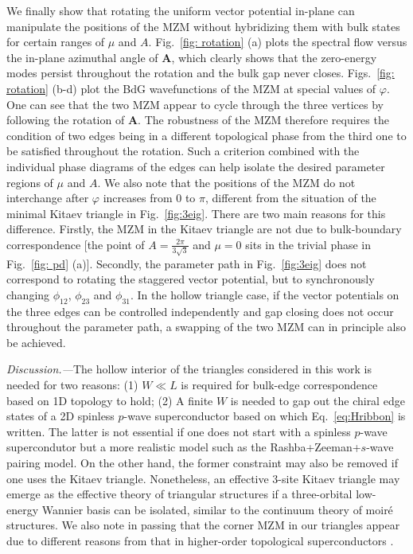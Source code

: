 \documentclass[aps,prb,twocolumn,showpacs,amsmath,amssymb,superscriptaddress]{revtex4-2}
\begin{document}
We finally show that rotating the uniform vector potential in-plane can manipulate the positions of the MZM without hybridizing them with bulk states for certain ranges of $\mu$ and $A$. Fig.~\ref{fig: rotation} (a) plots the spectral flow versus the in-plane azimuthal angle of $\mathbf A$, which clearly shows that the zero-energy modes persist throughout the rotation and the bulk gap never closes. Figs.~\ref{fig: rotation} (b-d) plot the BdG wavefunctions of the MZM at special values of $\varphi$. One can see that the two MZM appear to cycle through the three vertices by following the rotation of $\mathbf A$. The robustness of the MZM therefore requires the condition of two edges being in a different topological phase from the third one to be satisfied throughout the rotation. Such a criterion combined with the individual phase diagrams of the edges can help isolate the desired parameter regions of $\mu$ and $A$. We also note that the positions of the MZM do not interchange after $\varphi$ increases from 0 to $\pi$, different from the situation of the minimal Kitaev triangle in Fig.~\ref{fig:3eig}. There are two main reasons for this difference. Firstly, the MZM in the Kitaev triangle are not due to bulk-boundary correspondence [the point of $A = \frac{2\pi}{3\sqrt{3}}$ and $\mu=0$ sits in the trivial phase in Fig.~\ref{fig: pd} (a)]. Secondly, the parameter path in Fig.~\ref{fig:3eig} does not correspond to rotating the staggered vector potential, but to synchronously changing $\phi_{12}$, $\phi_{23}$ and $\phi_{31}$. In the hollow triangle case, if the vector potentials on the three edges can be controlled independently and gap closing does not occur throughout the parameter path, a swapping of the two MZM can in principle also be achieved.

\emph{Discussion.---}The hollow interior of the triangles considered in this work is needed for two reasons: (1) $W\ll L$ is required for bulk-edge correspondence based on 1D topology to hold; (2) A finite $W$ is needed to gap out the chiral edge states of a 2D spinless $p$-wave superconductor based on which Eq.~\eqref{eq:Hribbon} is written. The latter is not essential if one does not start with a spinless $p$-wave supercondutor but a more realistic model such as the Rashba+Zeeman+$s$-wave pairing model. On the other hand, the former constraint may also be removed if one uses the Kitaev triangle. Nonetheless, an effective 3-site Kitaev triangle may emerge as the effective theory of triangular structures if a three-orbital low-energy Wannier basis can be isolated, similar to the continuum theory of moir\'{e} structures. We also note in passing that the corner MZM in our triangles appear due to different reasons from that in higher-order topological superconductors \cite{wangEvidenceMajoranaBound2018,pahomiBraidingMajoranaCorner2020}.
\end{document}
